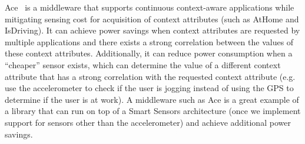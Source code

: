 Ace~\cite{ace} is a middleware that supports continuous context-aware applications while mitigating sensing cost for acquisition of context attributes (such as AtHome and IsDriving). It can achieve power savings when context attributes are requested by multiple applications and there exists a strong correlation between the values of these context attributes. Additionally, it can reduce power consumption when a ``cheaper'' sensor exists, which can determine the value of a different context attribute that has a strong correlation with the requested context attribute (e.g. use the accelerometer to check if the user is jogging instead of using the GPS to determine if the user is at work). A middleware such as Ace is a great example of a library that can run on top of a Smart Sensors architecture (once we implement support for sensors other than the accelerometer) and achieve additional power savings.